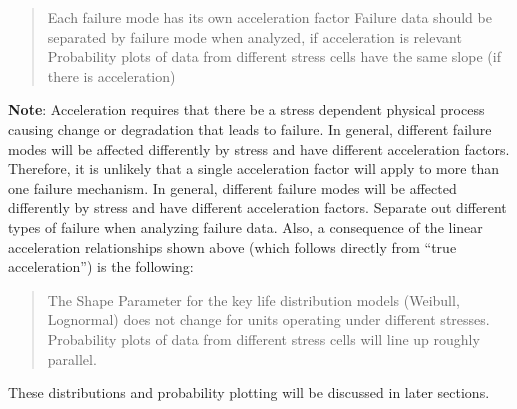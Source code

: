 \documentclass[]{book}
\theoremstyle{definition}
\theoremstyle{definition}
\theoremstyle{definition}
\theoremstyle{remark}
\begin{document}
\begin{quote}
Each failure mode has its own acceleration factor Failure data should be
separated by failure mode when analyzed, if acceleration is relevant
Probability plots of data from different stress cells have the same
slope (if there is acceleration)
\end{quote}

\textbf{Note}: Acceleration requires that there be a stress dependent
physical process causing change or degradation that leads to failure. In
general, different failure modes will be affected differently by stress
and have different acceleration factors. Therefore, it is unlikely that
a single acceleration factor will apply to more than one failure
mechanism. In general, different failure modes will be affected
differently by stress and have different acceleration factors. Separate
out different types of failure when analyzing failure data. Also, a
consequence of the linear acceleration relationships shown above (which
follows directly from ``true acceleration'') is the following:

\begin{quote}
The Shape Parameter for the key life distribution models (Weibull,
Lognormal) does not change for units operating under different stresses.
Probability plots of data from different stress cells will line up
roughly parallel.
\end{quote}

These distributions and probability plotting will be discussed in later
sections.


\end{document}
